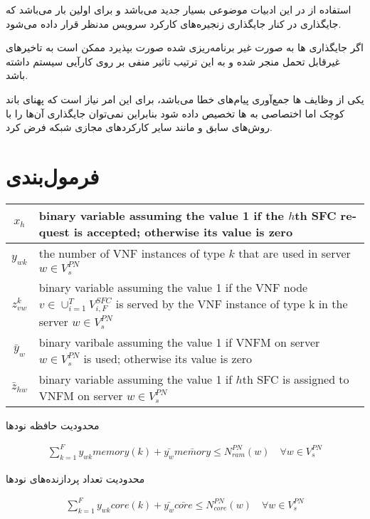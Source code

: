 استفاده از  در این ادبیات موضوعی بسیار جدید می‌باشد
و برای اولین بار می‌باشد که جایگذاری  در کنار جایگذاری
زنجیره‌های کارکرد سرویس مدنظر قرار داده می‌شود.

اگر جایگذاری ها به صورت غیر برنامه‌ریزی شده صورت بپذیرد
ممکن است به تاخیرهای غیرقابل تحمل منجر شده و به این ترتیب تاثیر منفی بر روی کارآیی سیستم
داشته باشد.

یکی از وظایف ها جمع‌آوری پیام‌های خطا می‌باشد،
برای این امر نیاز است که پهنای باند کوچک اما اختصاصی به ها
تخصیص داده شود بنابراین نمی‌توان جایگذاری آن‌ها را با روش‌های سابق و مانند سایر
کارکردهای مجازی شبکه فرض کرد.

\section{فرمول‌بندی}

\begin{center}\begin{latin}\begin{tabular}{|c|p{10cm}|}
    \hline
    $x_h$ & binary variable assuming the value 1 if the $h$th SFC request is accepted; otherwise its value is zero \\
    \hline
    $y_{wk}$ & the number of VNF instances of type $k$ that are used in server $w \in V_s^{PN}$ \\
    \hline
    $z^k_{vw}$ & binary variable assuming the value 1 if the VNF node $v \in \cup_{i=1}^{T} V_{i, F}^{SFC}$ is served by the VNF instance of type k in the server $w \in V_s^{PN}$ \\
    \hline
    $\bar{y}_w$ & binary varibale assuming the value 1 if VNFM on server $w \in V_s^{PN}$ is used; otherwise its value is zero\\
    \hline
    $\bar{z}_{hw}$ & binary variable assuming the value 1 if $h$th SFC is assigned to VNFM on server $w \in V_s^{PN}$\\
    \hline
\end{tabular}\end{latin}\end{center}

محدودیت حافظه نودها
\begin{latin}\begin{align}
    \sum_{k=1}^F y_{wk} memory(k) + \bar{y_w} \bar{memory} \le N_{ram}^{PN}(w)
	\quad
	\forall w \in V_s^{PN}
\end{align}\end{latin}

محدودیت تعداد پردازنده‌های نودها
\begin{latin}\begin{align}
	\sum_{k=1}^F y_{wk} core(k) + \bar{y_w} \bar{core} \le N_{core}^{PN}(w)
	\quad
	\forall w \in V_s^{PN}
\end{align}\end{latin}

